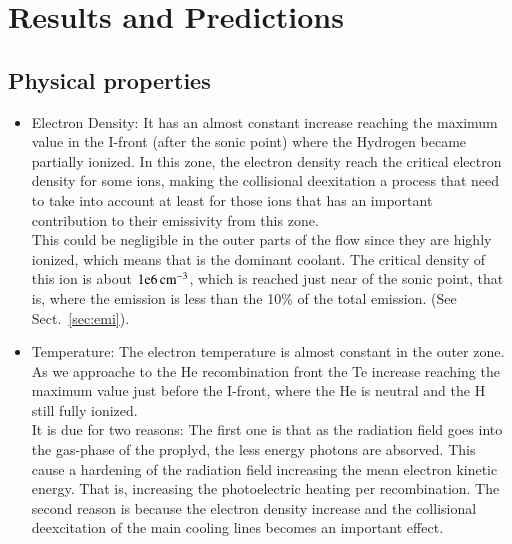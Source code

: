 \documentclass[useAMS,usenatbib]{mn2e}
\begin{document}
\section{Results and Predictions}
\label{sec:results}



\subsection{Physical properties}
\label{sec:physical}

\begin{itemize}
  \item{Electron Density: It has an almost constant increase reaching the maximum value in the I-front (after the sonic point) where the Hydrogen became partially ionized. In this zone, the electron density reach the critical electron density for some ions, making the collisional deexitation a process that need to take into account at least for those ions that has an important contribution to their emissivity from this zone.\\ 
This could be negligible in the outer parts of the flow since they are highly ionized, which means that \oiii is the dominant coolant. The critical density of this ion is about $\rm 1e6 \, cm^{-3}$, which is reached just near of the sonic point, that is, where the \oiii emission is less than the 10\% of the total \oiii emission. (See Sect.~\ref{sec:emi}).}
  \item{Temperature: The electron temperature is almost constant in the outer zone. As we approache to the He recombination front the Te increase reaching the maximum value just before the I-front, where the He is neutral and the H still fully ionized. \\
It is due for two reasons: The first one is that as the radiation field goes into the gas-phase of the proplyd, the less energy photons are absorved. This cause a hardening of the radiation field increasing the mean electron kinetic energy. That is, increasing the photoelectric heating per recombination. The second reason is because the electron density increase and the collisional deexcitation of the main cooling lines becomes an important effect.}
\end{itemize}
\end{document}
